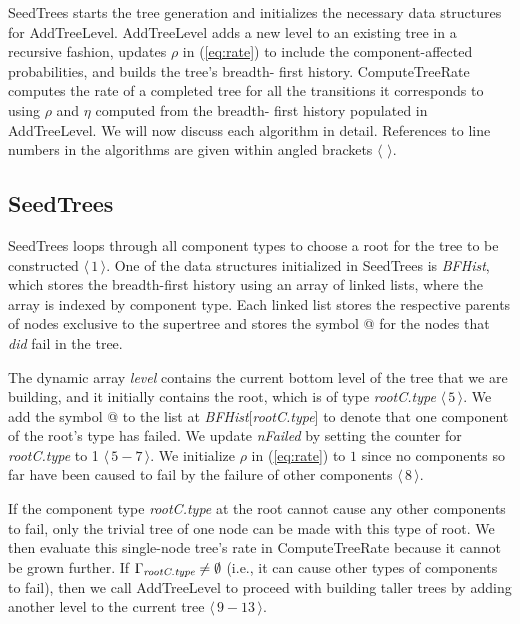 \documentclass[12pt]{article}
\newcommand{\varName}[1]{\textrm{\it#1}}
\newcommand{\citeLine}[1]{$\langle \, #1 \, \rangle$}
\newcommand{\citeBlock}[2]{$\langle \, #1 - #2 \, \rangle$}
\begin{document}
SeedTrees starts the tree generation and initializes the necessary data
structures for \mbox{AddTreeLevel}. \mbox{AddTreeLevel} adds a new level to an
existing tree in a recursive fashion, updates $\rho$ in (\ref{eq:rate}) to
include the component-affected probabilities, and builds the tree's breadth-
first history. ComputeTreeRate computes the rate of a completed tree for all the
transitions it corresponds to using $\rho$ and $\eta$ computed from the breadth-
first history populated in \mbox{AddTreeLevel}. We will now discuss each
algorithm in detail. References to line numbers in the algorithms are given
within angled brackets \citeLine{}.

\subsection{SeedTrees}
\label{sec:seedtrees}

SeedTrees loops through all component types to choose a root for the tree to be
constructed \citeLine{1}. One of the data structures initialized in SeedTrees is
\varName{BFHist}, which stores the breadth-first history using an array of
linked lists, where the array is indexed by component type. Each linked list
stores the respective parents of nodes exclusive to the supertree and stores the
symbol @ for the nodes that \textit{did} fail in the tree.

The dynamic array \varName{level} contains the current bottom level of the tree
that we are building, and it initially contains the root, which is of type
\varName{rootC.type} \citeLine{5}. We add the symbol @ to the list at
\varName{BFHist}[\varName{rootC.type}] to denote that one component of the
root's type has failed. We update \varName{nFailed} by setting the counter for
\varName{rootC.type} to 1 \citeBlock{5}{7}. We initialize $\rho$ in
(\ref{eq:rate}) to $1$ since no components so far have been caused to fail by
the failure of other components \citeLine{8}.

If the component type \varName{rootC.type} at the root cannot cause any other
components to fail, only the trivial tree of one node can be made with this type
of root. We then evaluate this single-node tree's rate in ComputeTreeRate
because it cannot be grown further. If $\Gamma_{\varName{rootC.type}} \neq
\emptyset$ (i.e., it can cause other types of components to fail), then we call
\mbox{AddTreeLevel} to proceed with building taller trees by adding another
level to the current tree \citeBlock{9}{13}.
\end{document}
